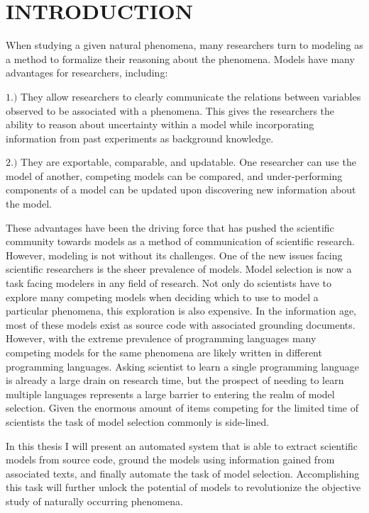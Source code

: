 \chapter{INTRODUCTION\label{chapter:introduction}}
When studying a given natural phenomena, many researchers turn to modeling as a method to formalize their reasoning about the phenomena. Models have many advantages for researchers, including:

$1.)$ They allow researchers to clearly communicate the relations between variables observed to be associated with a phenomena. This gives the researchers the ability to reason about uncertainty within a model while incorporating information from past experiments as background knowledge.

$2.)$ They are exportable, comparable, and updatable. One researcher can use the model of another, competing models can be compared, and under-performing components of a model can be updated upon discovering new information about the model.

These advantages have been the driving force that has pushed the scientific community towards models as a method of communication of scientific research. However, modeling is not without its challenges. One of the new issues facing scientific researchers is the sheer prevalence of models. Model selection is now a task facing modelers in any field of research. Not only do scientists have to explore many competing models when deciding which to use to model a particular phenomena, this exploration is also expensive. In the information age, most of these models exist as source code with associated grounding documents. However, with the extreme prevalence of programming languages many competing models for the same phenomena are likely written in different programming languages. Asking scientist to learn a single programming language is already a large drain on research time, but the prospect of needing to learn multiple languages represents a large barrier to entering the realm of model selection. Given the enormous amount of items competing for the limited time of scientists the task of model selection commonly is side-lined.

In this thesis I will present an automated system that is able to extract scientific models from source code, ground the models using information gained from associated texts, and finally automate the task of model selection. Accomplishing this task will further unlock the potential of models to revolutionize the objective study of naturally occurring phenomena.

